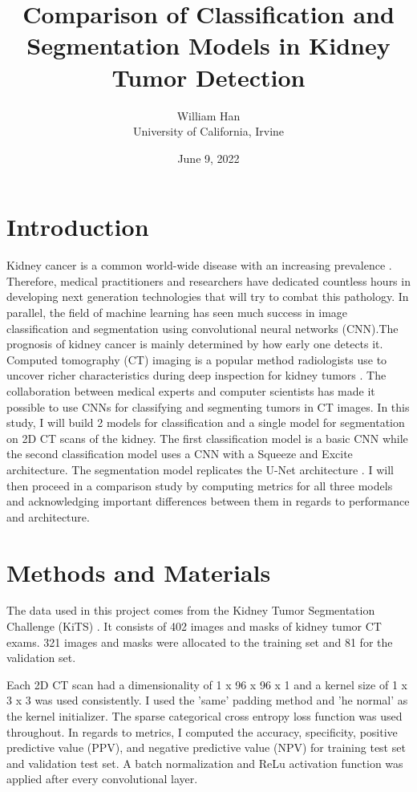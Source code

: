 \documentclass [12pt, letterpaper] {article}
\title{Comparison of Classification and Segmentation Models in Kidney Tumor Detection}
\author{William Han \\ University of California, Irvine}
\date{June 9, 2022}
\begin{document}
\maketitle

\section{Introduction}
Kidney cancer is a common world-wide disease with an increasing prevalence \cite{1}. Therefore, medical practitioners and researchers have dedicated countless hours in developing next generation technologies that will try to combat this pathology. In parallel, the field of machine learning has seen much success in image classification and segmentation using convolutional neural networks (CNN).The prognosis of kidney cancer is mainly determined by how early one detects it. Computed tomography (CT) imaging is a popular method radiologists use to uncover richer characteristics during deep inspection for kidney tumors \cite{1}. The collaboration between medical experts and computer scientists has made it possible to use CNNs for classifying and segmenting tumors in CT images. In this study, I will build 2 models for classification and a single model for segmentation on 2D CT scans of the kidney. The first classification model is a basic CNN while the second classification model uses a CNN with a Squeeze and Excite architecture. The segmentation model replicates the U-Net architecture \cite{2}. I will then proceed in a comparison study by computing metrics for all three models and acknowledging important differences between them in regards to performance and architecture. 


\section{Methods and Materials }
The data used in this project comes from the Kidney Tumor Segmentation Challenge (KiTS) \cite{1}. It consists of 402 images and masks of kidney tumor CT exams. 321 images and masks were allocated to the training set and 81 for the validation set. 

Each 2D CT scan had a dimensionality of 1 x 96 x 96 x 1 and a kernel size of 1 x 3 x 3 was used consistently. I used the 'same' padding method and 'he normal' as the kernel initializer. The sparse categorical cross entropy loss function was used throughout. In regards to metrics, I computed the accuracy, specificity, positive predictive value (PPV), and negative predictive value (NPV) for training test set and validation test set. A batch normalization and ReLu activation function was applied after every convolutional layer.
\end{document}
